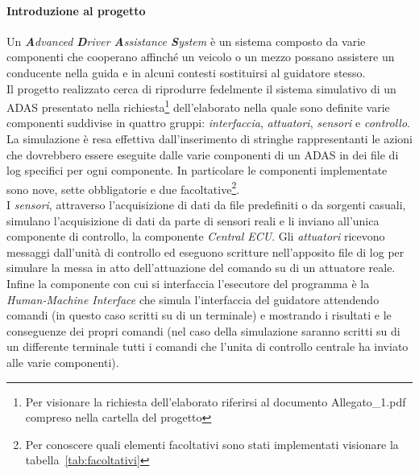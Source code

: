 \documentclass[11pt, openany]{article}
\theoremstyle{definition}
\theoremstyle{plain}
\theoremstyle{remark}
\begin{document}
		\paragraph{Introduzione al progetto}
			Un \textit{\textbf{A}dvanced \textbf{D}river \textbf{A}ssistance \textbf{S}ystem} è un sistema composto da varie componenti che cooperano affinché un veicolo o un mezzo possano assistere un conducente nella guida e in alcuni contesti sostituirsi al guidatore stesso.\\
			Il progetto realizzato cerca di riprodurre fedelmente il sistema simulativo di un ADAS presentato nella richiesta\footnote{Per visionare la richiesta dell'elaborato riferirsi al documento Allegato\_1.pdf compreso nella cartella del progetto} dell'elaborato nella quale sono definite varie componenti suddivise in quattro gruppi: \textit{interfaccia}, \textit{attuatori}, \textit{sensori} e \textit{controllo}.\\
			La simulazione è resa effettiva dall'inserimento di stringhe rappresentanti le azioni che dovrebbero essere eseguite dalle varie componenti di un ADAS in dei file di log specifici per ogni componente. In particolare le componenti implementate sono nove, sette obbligatorie e due facoltative\footnote{Per conoscere quali elementi facoltativi sono stati implementati visionare la tabella~\ref{tab:facoltativi}}.\\
			I \textit{sensori}, attraverso l'acquisizione di dati da file predefiniti o da sorgenti casuali, simulano l'acquisizione di dati da parte di sensori reali e li inviano all'unica componente di controllo, la componente \textit{Central ECU}. Gli \textit{attuatori} ricevono messaggi dall'unità di controllo ed eseguono scritture nell'apposito file di log per simulare la messa in atto dell'attuazione del comando su di un attuatore reale. Infine la componente con cui si interfaccia l'esecutore del programma è la \textit{Human-Machine Interface} che simula l'interfaccia del guidatore attendendo comandi (in questo caso scritti su di un terminale) e mostrando i risultati e le conseguenze dei propri comandi (nel caso della simulazione saranno scritti su di un differente terminale tutti i comandi che l'unita di controllo centrale ha inviato alle varie componenti).
\end{document}
